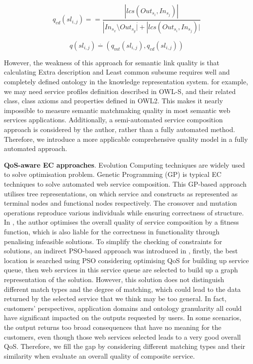 \documentclass{llncs}
\begin{document}
\begin{equation}
q_{cd}(sl{_{i,j}})={=} \frac{|lcs(Out_{s_i},In_{s_j})|}{|In_{s_{x}} \setminus Out_{s{_y}} \stackrel{.}| +|lcs(Out_{s_i},In_{s_j})| }
 \label{equation2}
\end{equation}

\begin{equation}
\label{equation3}
q(sl{_{i,j}}) \stackrel{.}{=} (q_{mt}(sl_{i,j}), q_{cd}(sl_{i,j}))
\end{equation}

However, the weakness of this approach for semantic link quality is that calculating Extra description and Least common subsume requires well and completely defined ontology in the knowledge representation system. for example, we may need service profiles definition described in OWL-S, and their related class, class axioms and properties defined in OWL2. This makes it nearly impossible to measure semantic matchmaking quality in most semantic web services applications. Additionally, a semi-automated service composition approach is considered by the author, rather than a fully automated method. Therefore, we introduce a more applicable comprehensive quality model in a fully automated approach.

\textbf{QoS-aware EC approaches}. Evolution Computing techniques are widely used to solve optimisation problem. Genetic Programming (GP) \cite{da2015graphevol,da2016particle} is typical EC techniques to solve automated web service composition. This GP-based approach utilises tree representations, on which service and constructs as represented as terminal nodes and functional nodes respectively. The crossover and mutation operations reproduce various individuals while ensuring correctness of structure. In \cite{yu2013adaptive}, the author optimises the overall quality of service composition by a fitness function, which is also liable for the correctness in functionality through penalising infeasible solutions. To simplify the checking of constraints for solutions, an indirect PSO-based approach was introduced in \cite{da2016particle}, firstly, the best location is searched using PSO considering optimising QoS for building up service queue, then web services in this service queue are selected to build up a graph representation of the solution. However, this solution does not distinguish different match types and the degree of matching, which could lead to the data returned by the selected service that we think may be too general. In fact, customers' perspectives, application domains and ontology granularity all could have significant impacted on the outputs requested by users. In some scenarios, the output returns too broad consequences that have no meaning for the customers, even though those web services selected leads to a very good overall QoS. Therefore, we fill the gap by considering different matching types and their similarity when evaluate an overall quality of composite service.
\end{document}
